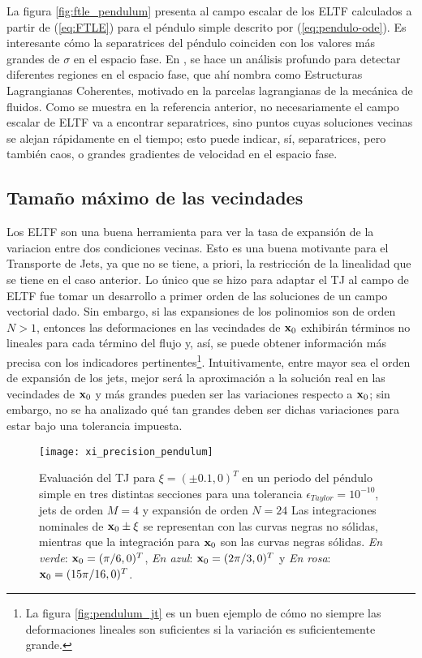La figura \ref{fig:ftle_pendulum} presenta al campo escalar de los ELTF calculados a partir de (\ref{eq:FTLE}) para el péndulo simple descrito por (\ref{eq:pendulo-ode}). Es interesante cómo la separatrices del péndulo coinciden con los valores más grandes de $\sigma$ en el espacio fase. En \cite{Haller2011}, se hace un análisis profundo para detectar diferentes regiones en el espacio fase, que ahí nombra como Estructuras Lagrangianas Coherentes, motivado en la parcelas lagrangianas de la mecánica de fluidos. Como se muestra en la referencia anterior, no necesariamente el campo escalar de ELTF va a encontrar separatrices, sino puntos cuyas soluciones vecinas se alejan rápidamente en el tiempo; esto puede indicar, sí, separatrices, pero también caos, o grandes gradientes de velocidad en el espacio fase.


\pagebreak
\subsection{Tamaño máximo de las vecindades}
\label{sec:ximax}

Los ELTF son una buena herramienta para ver la tasa de expansión de la variacion entre dos condiciones vecinas. Esto es una buena motivante para el Transporte de Jets, ya que no se tiene, a priori, la restricción de la linealidad que se tiene en el caso anterior. Lo único que se hizo para adaptar el TJ al campo de ELTF fue tomar un desarrollo a primer orden de las soluciones de un campo vectorial dado. Sin embargo, si las expansiones de los polinomios son de orden $N > 1$, entonces las deformaciones en las vecindades de $\mathbf{x}_0$ exhibirán términos no lineales para cada término del flujo y, así, se puede obtener información más precisa con los indicadores pertinentes\footnote{La figura \ref{fig:pendulum_jt} es un buen ejemplo de cómo no siempre las deformaciones lineales son suficientes si la variación es suficientemente grande.}. Intuitivamente, entre mayor sea el orden de expansión de los jets, mejor será la aproximación a la solución real en las vecindades de $\mathbf{x}_0$ y más grandes pueden ser las variaciones respecto a $\mathbf{x}_0$; sin embargo, no se ha analizado qué tan grandes deben ser dichas variaciones para estar bajo una tolerancia impuesta.

\begin{figure}[h!]
	\centering
	\texttt{[image: xi\_precision\_pendulum]}
	\caption{Evaluación del TJ para $\xi = ( \pm 0.1, 0)^T$ en un periodo del péndulo simple en tres distintas secciones para una tolerancia $\epsilon_{Taylor} = 10^{-10}$, jets de orden $M=4$ y expansión de orden $N=24$ Las integraciones nominales de $\mathbf{x}_0 \pm \xi$ se representan con las curvas negras no sólidas, mientras que la integración para $\mathbf{x}_0$ son las curvas negras sólidas. \textit{En verde}: $\mathbf{x}_0 = (\pi/6, 0)^T$, \textit{En azul}: $\mathbf{x}_0 = (2\pi/3, 0)^T$ y \textit{En rosa}: $\mathbf{x}_0 = (15\pi/16, 0)^T$.}
	\label{fig:xi_precision_pendulum}
\end{figure}

